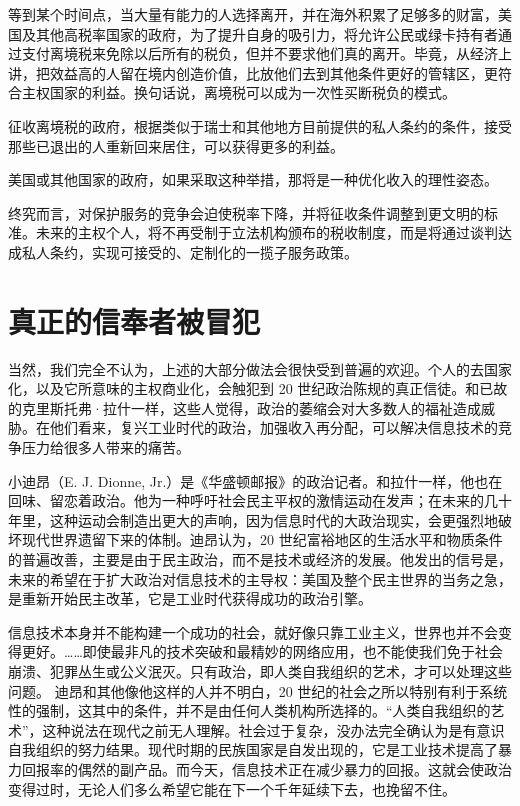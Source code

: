 等到某个时间点，当大量有能力的人选择离开，并在海外积累了足够多的财富，美国及其他高税率国家的政府，为了提升自身的吸引力，将允许公民或绿卡持有者通过支付离境税来免除以后所有的税负，但并不要求他们真的离开。毕竟，从经济上讲，把效益高的人留在境内创造价值，比放他们去到其他条件更好的管辖区，更符合主权国家的利益。换句话说，离境税可以成为一次性买断税负的模式。

征收离境税的政府，根据类似于瑞士和其他地方目前提供的私人条约的条件，接受那些已退出的人重新回来居住，可以获得更多的利益。

美国或其他国家的政府，如果采取这种举措，那将是一种优化收入的理性姿态。

终究而言，对保护服务的竞争会迫使税率下降，并将征收条件调整到更文明的标准。未来的主权个人，将不再受制于立法机构颁布的税收制度，而是将通过谈判达成私人条约，实现可接受的、定制化的一揽子服务政策。

\section{真正的信奉者被冒犯}
当然，我们完全不认为，上述的大部分做法会很快受到普遍的欢迎。个人的去国家化，以及它所意味的主权商业化，会触犯到 20 世纪政治陈规的真正信徒。和已故的克里斯托弗·拉什一样，这些人觉得，政治的萎缩会对大多数人的福祉造成威胁。在他们看来，复兴工业时代的政治，加强收入再分配，可以解决信息技术的竞争压力给很多人带来的痛苦。

小迪昂（E. J. Dionne, Jr.）是《华盛顿邮报》的政治记者。和拉什一样，他也在回味、留恋着政治。他为一种呼吁社会民主平权的激情运动在发声；在未来的几十年里，这种运动会制造出更大的声响，因为信息时代的大政治现实，会更强烈地破坏现代世界遗留下来的体制。迪昂认为，20 世纪富裕地区的生活水平和物质条件的普遍改善，主要是由于民主政治，而不是技术或经济的发展。他发出的信号是，未来的希望在于扩大政治对信息技术的主导权：美国及整个民主世界的当务之急，是重新开始民主改革，它是工业时代获得成功的政治引擎。

信息技术本身并不能构建一个成功的社会，就好像只靠工业主义，世界也并不会变得更好。……即使最非凡的技术突破和最精妙的网络应用，也不能使我们免于社会崩溃、犯罪丛生或公义泯灭。只有政治，即人类自我组织的艺术，才可以处理这些问题。 迪昂和其他像他这样的人并不明白，20 世纪的社会之所以特别有利于系统性的强制，这其中的条件，并不是由任何人类机构所选择的。“人类自我组织的艺术”，这种说法在现代之前无人理解。社会过于复杂，没办法完全确认为是有意识自我组织的努力结果。现代时期的民族国家是自发出现的，它是工业技术提高了暴力回报率的偶然的副产品。而今天，信息技术正在减少暴力的回报。这就会使政治变得过时，无论人们多么希望它能在下一个千年延续下去，也挽留不住。

